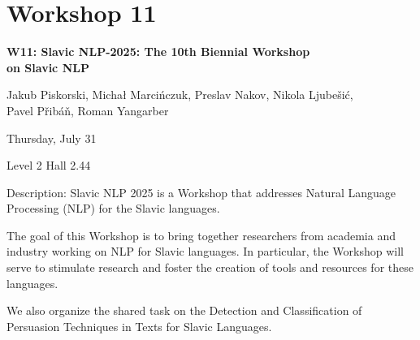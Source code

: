 \clearpage



\section[W11: Slavic NLP-2025: The 10th Biennial Workshop on Slavic NLP]{Workshop 11}
\label{workshop_11}

\begin{center}
    {\Large \textbf{W11: Slavic NLP-2025: The 10th Biennial Workshop \\
    on Slavic NLP}}\\
    
 \vspace{5mm}

   Jakub Piskorski, Michał Marcińczuk, Preslav Nakov, Nikola Ljubešić, \\
   Pavel Přibáň, Roman Yangarber\\

 \vspace{5mm}

    Thursday, July 31
    
   Level 2 Hall 2.44

\end{center}

Description: Slavic NLP 2025 is a Workshop that addresses Natural Language Processing (NLP) for the Slavic languages.

The goal of this Workshop is to bring together researchers from academia and industry working on NLP for Slavic languages. In particular, the Workshop will serve to stimulate research and foster the creation of tools and resources for these languages.

We also organize the shared task on the Detection and Classification of Persuasion Techniques in Texts for Slavic Languages.

